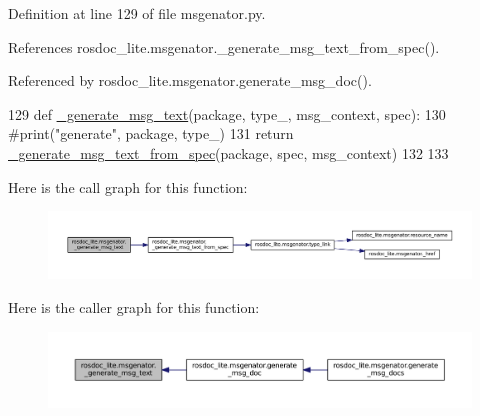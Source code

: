 Definition at line 129 of file msgenator.\+py.



References rosdoc\+\_\+lite.\+msgenator.\+\_\+generate\+\_\+msg\+\_\+text\+\_\+from\+\_\+spec().



Referenced by rosdoc\+\_\+lite.\+msgenator.\+generate\+\_\+msg\+\_\+doc().


\begin{DoxyCode}
129 \textcolor{keyword}{def }\hyperlink{namespacerosdoc__lite_1_1msgenator_a2dffbb93d16e371623e82b6ce7f46250}{\_generate\_msg\_text}(package, type\_, msg\_context, spec):
130     \textcolor{comment}{#print("generate", package, type\_)}
131     \textcolor{keywordflow}{return} \hyperlink{namespacerosdoc__lite_1_1msgenator_ae10b8c65520e15517f506220db1d916e}{\_generate\_msg\_text\_from\_spec}(package, spec, msg\_context)
132 
133 
\end{DoxyCode}


Here is the call graph for this function\+:
\nopagebreak
\begin{figure}[H]
\begin{center}
\leavevmode
\includegraphics[width=350pt]{namespacerosdoc__lite_1_1msgenator_a2dffbb93d16e371623e82b6ce7f46250_cgraph}
\end{center}
\end{figure}




Here is the caller graph for this function\+:
\nopagebreak
\begin{figure}[H]
\begin{center}
\leavevmode
\includegraphics[width=350pt]{namespacerosdoc__lite_1_1msgenator_a2dffbb93d16e371623e82b6ce7f46250_icgraph}
\end{center}
\end{figure}


